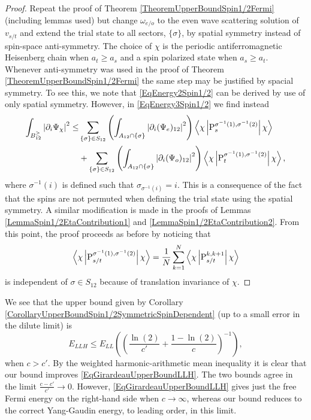 \begin{proof}
	Repeat the proof of Theorem \ref{TheoremUpperBoundSpin1/2Fermi} (including lemmas used) but change $ \omega_{e/o} $ to the even wave scattering solution of $ v_{s/t} $ and extend the trial state to all sectors, $ \{\sigma\} $, by spatial symmetry instead of spin-space anti-symmetry. The choice of $ \chi $ is the periodic antiferromagnetic Heisenberg chain when $ a_t\geq a_s $ and a spin polarized state when $ a_s\geq a_t $.
	Whenever anti-symmetry was used in the proof of Theorem \ref{TheoremUpperBoundSpin1/2Fermi} the same step may be justified by spacial symmetry. To see this, we note that \eqref{EqEnergy2Spin1/2} can be derived by use of only spatial symmetry. However, in \eqref{EqEnergy3Spin1/2} we find instead
	\begin{equation}
	\begin{aligned}
	\int_{B_{12}^{\geq}}\left\lvert \partial_i\Psi_{\chi} \right\rvert^2\leq&\sum_{\{\sigma\}\in S_{12}}\left(\int_{A_{12}\cap\{\sigma\}}\left\lvert \partial_i(\Psi_e)_{12} \right\rvert^2\right)\left\langle\chi \left\lvert \operatorname{P}^{\sigma^{-1}(1),\sigma^{-1}(2)}_s  \right\rvert \chi\right\rangle\\
	&+\sum_{\{\sigma\}\in S_{12}}\left(\int_{A_{12}\cap \{\sigma\}}\left\lvert \partial_i(\Psi_o)_{12} \right\rvert^2\right)\left\langle\chi \left\lvert \operatorname{P}^{\sigma^{-1}(1),\sigma^{-1}(2)}_t  \right\rvert \chi\right\rangle,
	\end{aligned}
	\end{equation}
	where $ \sigma^{-1}(i) $ is defined such that $ \sigma_{\sigma^{-1}(i)}=i $. This is a consequence of the fact that the spins are not permuted when defining the trial state using the spatial symmetry. A similar modification is made in the proofs of Lemmas \ref{LemmaSpin1/2EtaContribution1} and \ref{LemmaSpin1/2EtaContribution2}. From this point, the proof proceeds as before by noticing that 
	$$ \left\langle\chi \left\lvert \operatorname{P}^{\sigma^{-1}(1),\sigma^{-1}(2)}_{s/t}  \right\rvert \chi\right\rangle=\frac{1}{N}\sum_{k=1}^{N}\left\langle\chi \left\lvert \operatorname{P}^{k,k+1}_{s/t}  \right\rvert \chi\right\rangle $$
	is independent of $ \sigma\in S_{12} $ because of translation invariance of $ \chi $.
\end{proof}
We see that the upper bound given by Corollary \ref{CorollaryUpperBoundSpin1/2SymmetricSpinDependent} (up to a small error in the dilute limit) is \begin{equation}
E_{LLH}\leq E_{LL}\left(\left(\frac{\ln(2)}{c'}+\frac{1-\ln(2)}{c}\right)^{-1}\right),
\end{equation}
when $ c>c' $. By the weighted harmonic-arithmetic mean inequality it is clear that our bound improves \eqref{EqGirardeauUpperBoundLLH}. The two bounds agree in the limit $ \frac{c-c'}{c'}\to0 $. However, \eqref{EqGirardeauUpperBoundLLH} gives just the free Fermi energy on the right-hand side when $ c\to\infty $, whereas our bound reduces to the correct Yang-Gaudin energy, to leading order, in this limit.


